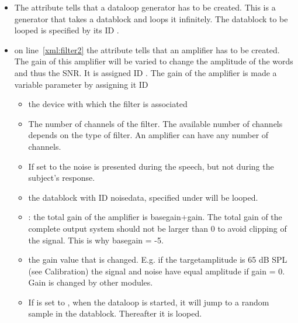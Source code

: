 \begin{itemize}

\item The attribute  tells \apex
that a dataloop generator has to be created. This is a generator
that takes a datablock and loops it infinitely. The datablock to
be looped is specified by its ID .

\item {} on line~\ref{xml:filter2} the attribute
 tells \apex that an amplifier has
to be created. The gain of this amplifier will be varied to change
the amplitude of the words and thus the SNR. It is assigned ID
. The gain of the amplifier is made a variable
parameter by assigning it ID 

\begin{itemize}

\item {} the device with which the filter is
associated

\item {} The number of channels of the filter. The
available number of channels depends on the type of filter. An
amplifier can have any number of channels.

\item {} If set to  the noise is
presented during the speech, but not during the subject's
response.

\item {} the datablock with ID noisedata,
specified under  will be looped.

\item {}:  the total gain of the amplifier is
basegain+gain. The total gain of the complete output system should
not be larger than 0 to avoid clipping of the signal. This is why
basegain = -5.

\item {} the gain value that is changed. E.g. if the
targetamplitude is 65 dB SPL (see Calibration) the signal and
noise have equal amplitude if gain = 0. Gain is changed by other
modules.

\item If  is set to , when the
dataloop is started, it will jump to a random sample in the
datablock. Thereafter it is looped.

\end{itemize}

\end{itemize}
   
   

